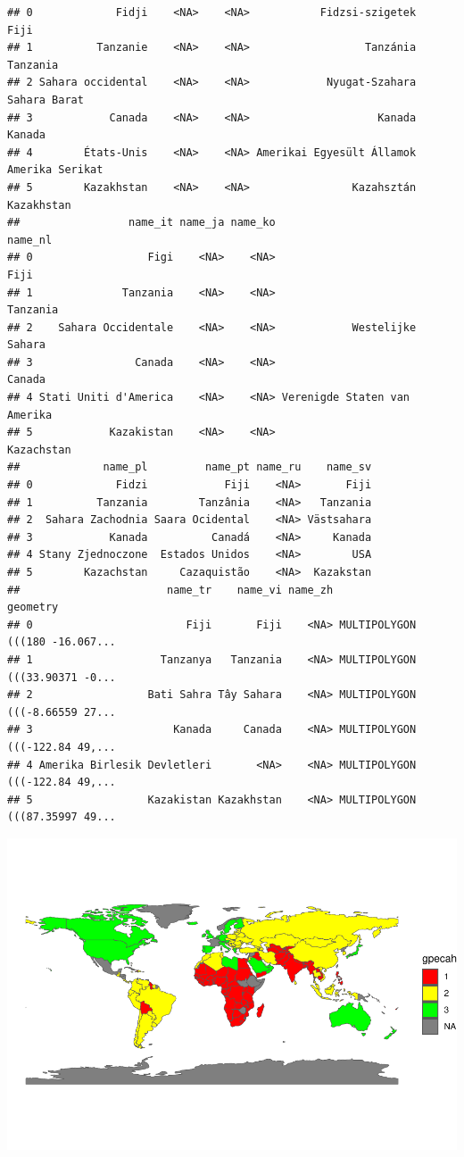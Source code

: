 \documentclass[
]{article}
\begin{document}
\begin{verbatim}
## 0             Fidji    <NA>    <NA>           Fidzsi-szigetek            Fiji
## 1          Tanzanie    <NA>    <NA>                  Tanzánia        Tanzania
## 2 Sahara occidental    <NA>    <NA>            Nyugat-Szahara    Sahara Barat
## 3            Canada    <NA>    <NA>                    Kanada          Kanada
## 4        États-Unis    <NA>    <NA> Amerikai Egyesült Államok Amerika Serikat
## 5        Kazakhstan    <NA>    <NA>                Kazahsztán      Kazakhstan
##                 name_it name_ja name_ko                      name_nl
## 0                  Figi    <NA>    <NA>                         Fiji
## 1              Tanzania    <NA>    <NA>                     Tanzania
## 2    Sahara Occidentale    <NA>    <NA>            Westelijke Sahara
## 3                Canada    <NA>    <NA>                       Canada
## 4 Stati Uniti d'America    <NA>    <NA> Verenigde Staten van Amerika
## 5            Kazakistan    <NA>    <NA>                   Kazachstan
##             name_pl         name_pt name_ru    name_sv
## 0             Fidzi            Fiji    <NA>       Fiji
## 1          Tanzania        Tanzânia    <NA>   Tanzania
## 2  Sahara Zachodnia Saara Ocidental    <NA> Västsahara
## 3            Kanada          Canadá    <NA>     Kanada
## 4 Stany Zjednoczone  Estados Unidos    <NA>        USA
## 5        Kazachstan     Cazaquistão    <NA>  Kazakstan
##                       name_tr    name_vi name_zh                       geometry
## 0                        Fiji       Fiji    <NA> MULTIPOLYGON (((180 -16.067...
## 1                    Tanzanya   Tanzania    <NA> MULTIPOLYGON (((33.90371 -0...
## 2                  Bati Sahra Tây Sahara    <NA> MULTIPOLYGON (((-8.66559 27...
## 3                      Kanada     Canada    <NA> MULTIPOLYGON (((-122.84 49,...
## 4 Amerika Birlesik Devletleri       <NA>    <NA> MULTIPOLYGON (((-122.84 49,...
## 5                  Kazakistan Kazakhstan    <NA> MULTIPOLYGON (((87.35997 49...
\end{verbatim}

\includegraphics{Projet_files/figure-latex/unnamed-chunk-31-1.pdf}
\end{document}
